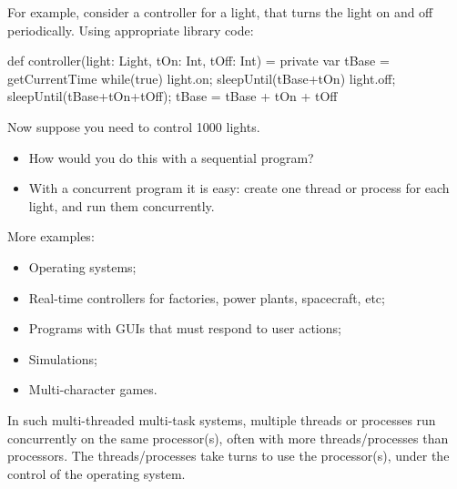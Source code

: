 \documentclass[notes,color]{sepslide0}
\begin{document}
\begin{slide}

For example, consider a controller for a light, that turns the light on and
off periodically.  Using appropriate library code:
%
\begin{scala}
def controller(light: Light, tOn: Int, tOff: Int) = {
  private var tBase = getCurrentTime
  while(true){
    light.on; sleepUntil(tBase+tOn)
    light.off; sleepUntil(tBase+tOn+tOff); tBase = tBase + tOn + tOff
  }
}
\end{scala}

Now suppose you need to control 1000 lights.  
%
\begin{itemize}
\item
How would you do this with a sequential program?

\item
With a concurrent program it is easy: create one thread or process for each
light, and run them concurrently.
\end{itemize}
\end{slide}


\begin{slide}

More examples:
%
\begin{itemize}
\item
Operating systems;

\item
Real-time controllers for factories, power plants, spacecraft, etc;

\item
Programs with GUIs that must respond to user actions;

\item
Simulations;

\item
Multi-character games.
\end{itemize}

In such multi-threaded multi-task systems, multiple threads or processes run
concurrently on the same processor(s), often with more threads/processes than
processors.  The threads/processes take turns to use the processor(s), under
the control of the operating system.
\end{slide}

\end{document}
